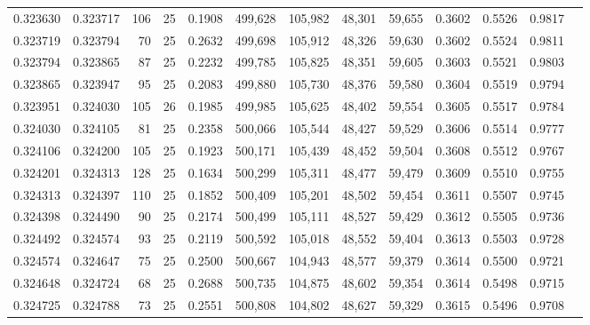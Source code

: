 \begin{tabular}{rrrrrrrrrrrrr}
0.323630 & 0.323717 &   106 &  25 &                                     0.1908 & 499,628 & 105,982 &  48,301 &  59,655 & 0.3602 & 0.5526 & 0.9817 \\
0.323719 & 0.323794 &    70 &  25 &                                     0.2632 & 499,698 & 105,912 &  48,326 &  59,630 & 0.3602 & 0.5524 & 0.9811 \\
0.323794 & 0.323865 &    87 &  25 &                                     0.2232 & 499,785 & 105,825 &  48,351 &  59,605 & 0.3603 & 0.5521 & 0.9803 \\
0.323865 & 0.323947 &    95 &  25 &                                     0.2083 & 499,880 & 105,730 &  48,376 &  59,580 & 0.3604 & 0.5519 & 0.9794 \\
0.323951 & 0.324030 &   105 &  26 &                                     0.1985 & 499,985 & 105,625 &  48,402 &  59,554 & 0.3605 & 0.5517 & 0.9784 \\
0.324030 & 0.324105 &    81 &  25 &                                     0.2358 & 500,066 & 105,544 &  48,427 &  59,529 & 0.3606 & 0.5514 & 0.9777 \\
0.324106 & 0.324200 &   105 &  25 &                                     0.1923 & 500,171 & 105,439 &  48,452 &  59,504 & 0.3608 & 0.5512 & 0.9767 \\
0.324201 & 0.324313 &   128 &  25 &                                     0.1634 & 500,299 & 105,311 &  48,477 &  59,479 & 0.3609 & 0.5510 & 0.9755 \\
0.324313 & 0.324397 &   110 &  25 &                                     0.1852 & 500,409 & 105,201 &  48,502 &  59,454 & 0.3611 & 0.5507 & 0.9745 \\
0.324398 & 0.324490 &    90 &  25 &                                     0.2174 & 500,499 & 105,111 &  48,527 &  59,429 & 0.3612 & 0.5505 & 0.9736 \\
0.324492 & 0.324574 &    93 &  25 &                                     0.2119 & 500,592 & 105,018 &  48,552 &  59,404 & 0.3613 & 0.5503 & 0.9728 \\
0.324574 & 0.324647 &    75 &  25 &                                     0.2500 & 500,667 & 104,943 &  48,577 &  59,379 & 0.3614 & 0.5500 & 0.9721 \\
0.324648 & 0.324724 &    68 &  25 &                                     0.2688 & 500,735 & 104,875 &  48,602 &  59,354 & 0.3614 & 0.5498 & 0.9715 \\
0.324725 & 0.324788 &    73 &  25 &                                     0.2551 & 500,808 & 104,802 &  48,627 &  59,329 & 0.3615 & 0.5496 & 0.9708 \\

\end{tabular}
